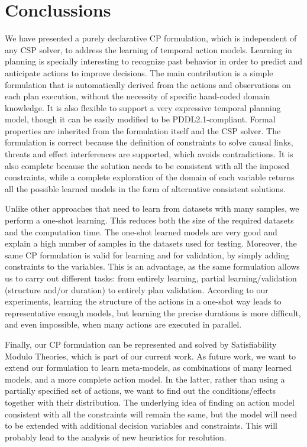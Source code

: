 \documentclass{ecai}
\begin{document}
\section{Conclussions}
\label{sec:conclusions}


We have presented a purely declarative CP formulation, which is independent of any CSP solver, to address the learning of temporal action models. Learning in planning is specially interesting to recognize past behavior in order to predict and anticipate actions to improve decisions.
The main contribution is a simple formulation that is automatically derived from the actions and observations on each plan execution, without the necessity of specific hand-coded domain knowledge. It is also flexible to support a very expressive temporal planning model, though it can be easily modified to be PDDL2.1-compliant.
Formal properties are inherited from the formulation itself and the CSP solver. The formulation is correct because the definition of constraints to solve causal links, threats and effect interferences are supported, which avoids contradictions. It is also complete because the solution needs to be consistent with all the imposed constraints, while a complete exploration of the domain of each variable returns all the possible learned models in the form of alternative consistent solutions.


Unlike other approaches that need to learn from datasets with many samples, we perform a one-shot learning. This reduces both the size of the required datasets and the computation time. The one-shot learned models are very good and explain a high number of samples in the datasets used for testing. Moreover, the same CP formulation is valid for learning and for validation, by simply adding constraints to the variables. This is an advantage, as the same formulation allows us to carry out different tasks: from entirely learning, partial learning/validation (structure and/or duration) to entirely plan validation.
According to our experiments, learning the structure of the actions in a one-shot way leads to representative enough models, but learning the precise durations is more difficult, and even impossible, when many actions are executed in parallel.


Finally,
our CP formulation can be represented and solved by Satisfiability Modulo Theories, which is part of our current work. As future work, we want to extend our formulation to learn meta-models, as combinations of many learned models, and a more complete action model.
In the latter, rather than using a partially specified set of actions, we want to find out the conditions/effects together with their distribution.
The underlying idea of finding an action model consistent with all the constraints will remain the same, but the model will need to be extended with additional decision variables and constraints. %
This will probably lead to the analysis of new heuristics for resolution.



\end{document}
